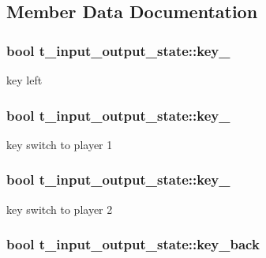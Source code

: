 \subsection{Member Data Documentation}
\hypertarget{structt__input__output__state_a050ec7d2c78152a00db4e9ad1f3329ed}{
\subsubsection[{key\-\_\-1}]{\setlength{\rightskip}{0pt plus 5cm}bool t\-\_\-input\-\_\-output\-\_\-state\-::key\-\_}}\label{structt__input__output__state_a050ec7d2c78152a00db4e9ad1f3329ed}
key left \hypertarget{structt__input__output__state_a919f0b46728019de55dd02716f529364}{
\subsubsection[{key\-\_\-2}]{\setlength{\rightskip}{0pt plus 5cm}bool t\-\_\-input\-\_\-output\-\_\-state\-::key\-\_}}\label{structt__input__output__state_a919f0b46728019de55dd02716f529364}
key switch to player 1 \hypertarget{structt__input__output__state_a24ef3f98deef214934007a0d88aeea82}{
\subsubsection[{key\-\_\-3}]{\setlength{\rightskip}{0pt plus 5cm}bool t\-\_\-input\-\_\-output\-\_\-state\-::key\-\_}}\label{structt__input__output__state_a24ef3f98deef214934007a0d88aeea82}
key switch to player 2 \hypertarget{structt__input__output__state_a12366e6b5751103da0959aee7b55122b}{
\subsubsection[{key\-\_\-back}]{\setlength{\rightskip}{0pt plus 5cm}bool t\-\_\-input\-\_\-output\-\_\-state\-::key\-\_\-back}}\label{structt__input__output__state_a12366e6b5751103da0959aee7b55122b}
